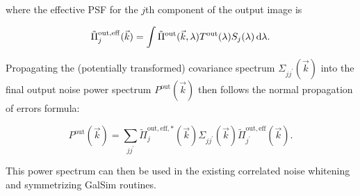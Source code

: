 \documentclass{article}
\begin{document}
where the effective PSF for the $j$th component of the output image is

\begin{equation}
  \tilde{\Pi}_j^\mathrm{out, eff}(\vec{k}) = \int \tilde{\Pi}^\mathrm{out}(\vec{k}, \lambda) T^\mathrm{out}(\lambda) S_j(\lambda)\dif{\lambda}.
\end{equation}

Propagating the (potentially transformed) covariance spectrum $\Sigma_{jj^\prime}(\vec{k})$ into the
final output noise power spectrum $P^\mathrm{out}(\vec{k})$ then follows the normal propagation of
errors formula:

\begin{equation}
  P^\mathrm{out}(\vec{k}) = \sum_{jj^\prime} \tilde{\Pi}_j^\mathrm{out, eff, *}(\vec{k}) \Sigma_{jj^\prime}(\vec{k}) \tilde{\Pi}_{j^\prime}^\mathrm{out, eff}(\vec{k}).
\end{equation}

This power spectrum can then be used in the existing correlated noise whitening and symmetrizing
GalSim routines.
\end{document}
